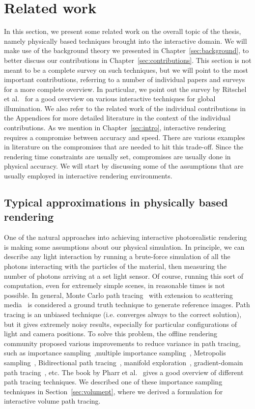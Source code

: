 \chapter{Related work}
%
\label{sec:related}
%
In this section, we present some related work on the overall topic of the thesis, namely physically based techniques brought into the interactive domain. We will make use of the background theory we presented in Chapter~\ref{sec:background}, to better discuss our contributions in Chapter~\ref{sec:contributions}. This section is not meant to be a complete survey on such techniques, but we will point to the most important contributions, referring to a number of individual papers and surveys for a more complete overview. In particular, we point out the survey by Ritschel et al.~\cite{Ritschel2012} for a good overview on various interactive techniques for global illumination. We also refer to the related work of the individual contributions in the Appendices for more detailed literature in the context of the individual contributions. 
%
As we mention in Chapter~\ref{sec:intro}, interactive rendering requires a compromise between accuracy and speed. There are various examples in literature on the compromises that are needed to hit this trade-off. Since the rendering time constraints are usually set, compromises are usually done in physical accuracy. We will start by discussing some of the assumptions that are usually employed in interactive rendering environments. 
%
\section{Typical approximations in physically based rendering}

One of the natural approaches into achieving interactive photorealistic rendering is making some assumptions about our physical simulation. In principle, we can describe any light interaction by running a brute-force simulation of all the photons interacting with the particles of the material, then measuring the number of photons arriving at a set light sensor. Of course, running this sort of computation, even for extremely simple scenes, in reasonable times is not possible. In general, Monte Carlo path tracing~\cite{Kajiya1986} with extension to scattering media~\cite{Rushmeier1988} is considered a ground truth technique to generate reference images. Path tracing is an unbiased technique (i.e. converges always to the correct solution), but it gives extremely noisy results, especially for particular configurations of light and camera positions. To solve this problem, the offline rendering community proposed various improvements to reduce variance in path tracing, such as importance sampling~\cite{Kirk1991},multiple importance sampling~\cite{Veach1995}, Metropolis sampling~\cite{Veach1995}, Bidirectional path tracing~\cite{Veach1997}, manifold exploration~\cite{Jakob2012}, gradient-domain path tracing~\cite{Kettunen2015}, etc. The book by Pharr et al.~\cite{Pharr2017} gives a good overview of different path tracing techniques. We described one of these importance sampling techniques in Section~\ref{sec:volumept}, where we derived a formulation for interactive volume path tracing.

